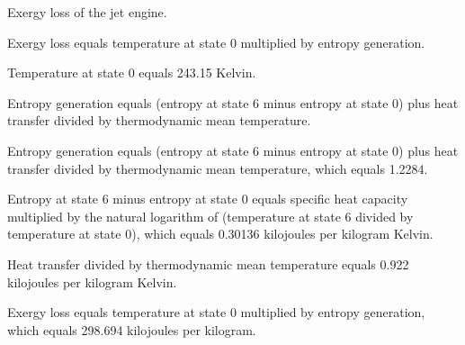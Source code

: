 Exergy loss of the jet engine.  

Exergy loss equals temperature at state 0 multiplied by entropy generation.  

Temperature at state 0 equals 243.15 Kelvin.  

Entropy generation equals (entropy at state 6 minus entropy at state 0) plus heat transfer divided by thermodynamic mean temperature.  

Entropy generation equals (entropy at state 6 minus entropy at state 0) plus heat transfer divided by thermodynamic mean temperature, which equals 1.2284.  

Entropy at state 6 minus entropy at state 0 equals specific heat capacity multiplied by the natural logarithm of (temperature at state 6 divided by temperature at state 0), which equals 0.30136 kilojoules per kilogram Kelvin.  

Heat transfer divided by thermodynamic mean temperature equals 0.922 kilojoules per kilogram Kelvin.  

Exergy loss equals temperature at state 0 multiplied by entropy generation, which equals 298.694 kilojoules per kilogram.